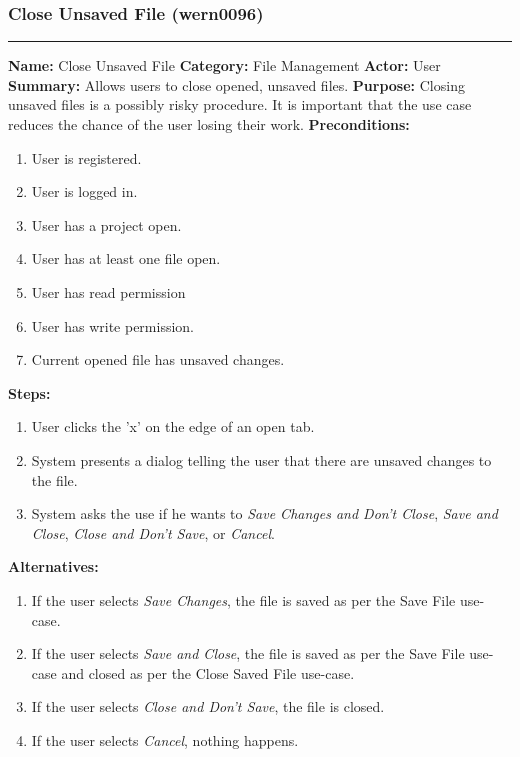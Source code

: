 \documentclass[11pt]{report}
\begin{document}
\subsubsection{Close Unsaved File (wern0096)}
\vspace{2pt}
\hrule
\vspace{8pt}
	\noindent\textbf{Name:} Close Unsaved File \newline
	\textbf{Category:} File Management \newline
	\textbf{Actor:} User \newline
	\textbf{Summary:} Allows users to close opened, unsaved files. \newline
	\textbf{Purpose:} Closing unsaved files is a possibly risky procedure. It is important that the use case reduces the chance of the user losing their work. \newline
	\textbf{Preconditions:}
	\begin{enumerate}
		\item User is registered.
		\item User is logged in.
		\item User has a project open.
		\item User has at least one file open.
		\item User has read permission
		\item User has write permission.
		\item Current opened file has unsaved changes.
	\end{enumerate}
	\textbf{Steps:}
	\begin{enumerate}
		\item User clicks the 'x' on the edge of an open tab.
		\item System presents a dialog telling the user that there are unsaved changes to the file.
		\item System asks the use if he wants to \textit{Save Changes and Don't Close}, \textit{Save and Close}, \textit{Close and Don't Save}, or \textit{Cancel}.
	\end{enumerate}
	\textbf{Alternatives:}
	\begin{enumerate}
		\item If the user selects \textit{Save Changes}, the file is saved as per the Save File use-case.
		\item If the user selects \textit{Save and Close}, the file is saved as per the Save File use-case and closed as per the Close Saved File use-case.
		\item If the user selects \textit{Close and Don't Save}, the file is closed.
		\item If the user selects \textit{Cancel}, nothing happens.
	\end{enumerate}
\end{document}
